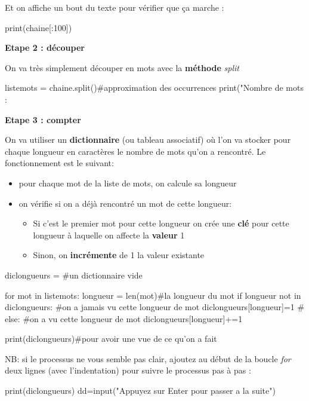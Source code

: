 Et on affiche un bout du texte pour vérifier que ça marche :

\begin{python} print(chaine{[}:100{]}) \end{python}

\textbf{Etape 2 : découper}

On va très simplement découper en mots avec la \textbf{méthode} \textit{split}
\begin{python} listemots = chaine.split()\#approximation des occurrences
print("Nombre de mots : %
\end{python}

\textbf{Etape 3 : compter}

On va utiliser un \textbf{dictionnaire} (ou tableau associatif) où
l'on va stocker pour chaque longueur en caractères le nombre de mots
qu'on a rencontré. Le fonctionnement est le suivant: 
\begin{itemize}
\item pour chaque mot de la liste de mots, on calcule sa longueur 
\item on vérifie si on a déjà rencontré un mot de cette longueur: 
\begin{itemize}
\item Si c'est le premier mot pour cette longueur on crée une \textbf{clé}
pour cette longueur à laquelle on affecte la \textbf{valeur} 1 
\item Sinon, on \textbf{incrémente} de 1 la valeur existante 
\end{itemize}
\end{itemize}
\begin{python} diclongueurs = {} \#un dictionnaire vide

for mot in listemots: longueur = len(mot)\#la longueur du mot if longueur
not in diclongueurs: \#on a jamais vu cette longueur de mot diclongueurs{[}longueur{]}=1
\# else: \#on a vu cette longueur de mot diclongueurs{[}longueur{]}+=1

print(diclongueurs)\#pour avoir une vue de ce qu'on a fait

\end{python}

NB: si le processus ne vous semble pas clair, ajoutez au début de
la boucle \textit{for} deux lignes (avec l'indentation) pour suivre
le processus pas à pas :

\begin{python} print(diclongueurs) dd=input("Appuyez sur Enter pour
passer a la suite") \end{python}


